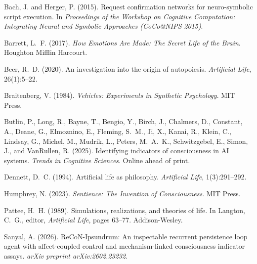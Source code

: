 \documentclass[letterpaper]{article}
\begin{document}
\footnotesize
\begin{thebibliography}{}

Bach, J. and Herger, P. (2015).
\newblock Request confirmation networks for neuro-symbolic script execution.
\newblock In \emph{Proceedings of the Workshop on Cognitive Computation: Integrating Neural and Symbolic Approaches (CoCo@NIPS 2015)}.

Barrett, L.~F. (2017).
\newblock \emph{How Emotions Are Made: The Secret Life of the Brain}.
\newblock Houghton Mifflin Harcourt.

Beer, R.~D. (2020).
\newblock An investigation into the origin of autopoiesis.
\newblock \emph{Artificial Life}, 26(1):5--22.

Braitenberg, V. (1984).
\newblock \emph{Vehicles: Experiments in Synthetic Psychology}.
\newblock MIT Press.

Butlin, P., Long, R., Bayne, T., Bengio, Y., Birch, J., Chalmers, D., Constant, A., Deane, G., Elmoznino, E., Fleming, S.~M., Ji, X., Kanai, R., Klein, C., Lindsay, G., Michel, M., Mudrik, L., Peters, M.~A.~K., Schwitzgebel, E., Simon, J., and VanRullen, R. (2025).
\newblock Identifying indicators of consciousness in {AI} systems.
\newblock \emph{Trends in Cognitive Sciences}. Online ahead of print.

Dennett, D.~C. (1994).
\newblock Artificial life as philosophy.
\newblock \emph{Artificial Life}, 1(3):291--292.

Humphrey, N. (2023).
\newblock \emph{Sentience: The Invention of Consciousness}.
\newblock MIT Press.

Pattee, H.~H. (1989).
\newblock Simulations, realizations, and theories of life.
\newblock In Langton, C.~G., editor, \emph{Artificial Life}, pages 63--77. Addison-Wesley.

Sanyal, A. (2026).
\newblock ReCoN-Ipsundrum: An inspectable recurrent persistence loop agent with affect-coupled control and mechanism-linked consciousness indicator assays.
\newblock \emph{arXiv preprint arXiv:2602.23232}.

\end{thebibliography}
\end{document}
